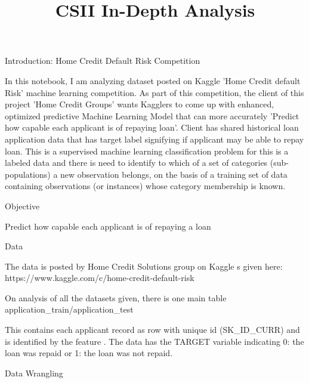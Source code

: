 \documentclass[11pt]{article}
\title{CSII In-Depth Analysis}
\begin{document}
    
    
    \maketitle
    
    

    
    Introduction: Home Credit Default Risk Competition

    In this notebook, I am analyzing dataset posted on Kaggle 'Home Credit
default Risk' machine learning competition. As part of this competition,
the client of this project 'Home Credit Groups' wants Kagglers to come
up with enhanced, optimized predictive Machine Learning Model that can
more accurately 'Predict how capable each applicant is of repaying
loan'. Client has shared historical loan application data that has
target label signifying if applicant may be able to repay loan. This is
a supervised machine learning classification problem for this is a
labeled data and there is need to identify to which of a set of
categories (sub-populations) a new observation belongs, on the basis of
a training set of data containing observations (or instances) whose
category membership is known.

    Objective

     Predict how capable each applicant is of repaying a loan

    Data

    The data is posted by Home Credit Solutions group on Kaggle s given
here: https://www.kaggle.com/c/home-credit-default-risk

On analysis of all the datasets given, there is one main table
application\_train/application\_test

This contains each applicant record as row with unique id (SK\_ID\_CURR)
and is identified by the feature . The data has the TARGET variable
indicating 0: the loan was repaid or 1: the loan was not repaid.

    Data Wrangling
\end{document}
